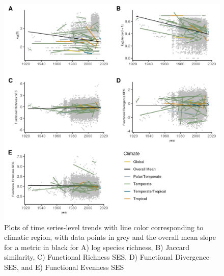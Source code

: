 \documentclass{article}
\begin{document}
\begin{figure}
\includegraphics[width=\textwidth]{../../figures/3met_long} \caption{Plots of time series-level trends with line color corresponding to climatic region, with data points in grey and the overall mean slope for a metric in black for A) log species richness, B) Jaccard similarity, C) Functional Richness SES, D) Functional Divergence SES, and E) Functional Evenness SES}\label{fig:timeseriesPlot}
\end{figure}
\end{document}
